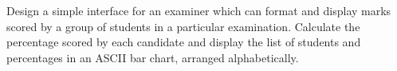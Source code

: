 

\problem Design a simple interface for an examiner which can format and display marks scored by a group
of students in a particular examination. Calculate the percentage scored by each candidate and display the
list of students and percentages in an ASCII bar chart, arranged alphabetically.

\solution 

\sourcecode

